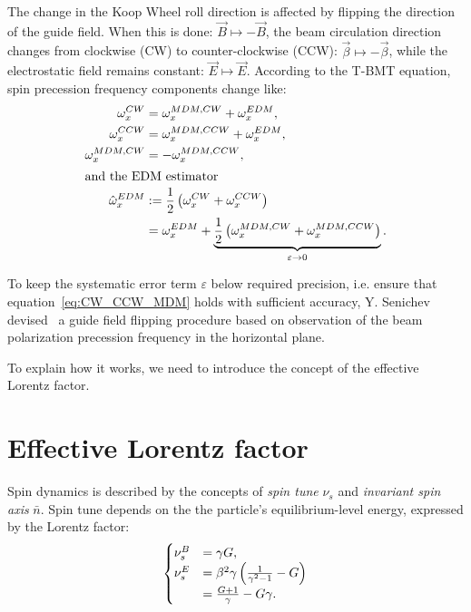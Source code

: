 \documentclass[a4paper]{jacow}
\newcommand{\w}{\omega}
\newcommand{\nbar}{\bar n}
\begin{document}
The change in the Koop Wheel roll direction is affected by flipping the direction of the guide field.
When this is done:
$\vec B \mapsto -\vec B$, the beam circulation direction changes from clockwise (CW) to counter-clockwise (CCW): 
$\vec\beta \mapsto -\vec\beta$, while the electrostatic field remains constant: $\vec E \mapsto \vec E$.
According to the T-BMT equation, spin precession frequency components change like:
\begin{subequations}
  \begin{align}
    \w_x^{CW} &= \w_x^{MDM, CW}   + \w_x^{EDM}, \notag\\
    \w_x^{CCW} &= \w_x^{MDM, CCW} + \w_x^{EDM}, \notag\\
    \w_x^{MDM, CW} &= -\w_x^{MDM, CCW}, \label{eq:CW_CCW_MDM}\\
    \intertext{and the EDM estimator}
    \hat\w_x^{EDM} &:= \frac12\bkt{\w_x^{CW} + \w_x^{CCW}} \label{eq:FDM_estimator} \\
                  &=  \w_x^{EDM} +
          \underbrace{\frac12\bkt{\w_x^{MDM, CW} + \w_x^{MDM, CCW}}}_{\varepsilon \to 0}.
  \end{align}
\end{subequations}

To keep the systematic error term $\varepsilon$ below required precision, i.e. ensure
that equation~\eqref{eq:CW_CCW_MDM} holds with sufficient accuracy, Y. Senichev 
devised~\cite{Senichev:FDM} a guide field flipping procedure
based on observation of the beam polarization precession frequency in the horizontal plane.

To explain how it works, we need to introduce the concept of the effective Lorentz factor.

\section{Effective Lorentz factor}
Spin dynamics is described by the concepts of \emph{spin tune} $\nu_s$ and \emph{invariant spin axis} $\nbar$.
Spin tune depends on the the particle's  equilibrium-level energy, expressed by the Lorentz factor:
\begin{equation}\label{eq:spin_tune_vs_gamma}
  \begin{cases}
    \nu_s^B &= \gamma G, \\
    \nu_s^E &= \beta^2\gamma\bkt{\frac{1}{\gamma^2-1} - G} \\
            &= \frac{G+1}{\gamma} - G\gamma.
  \end{cases}
\end{equation}
\end{document}
